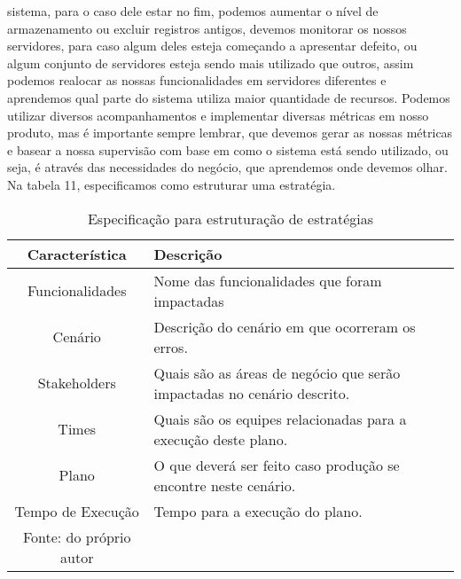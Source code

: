       sistema, para o caso dele estar no fim, podemos aumentar o nível de armazenamento
      ou excluir registros antigos, devemos monitorar os nossos servidores, para
      caso algum deles esteja começando a apresentar defeito, ou algum conjunto
      de servidores esteja sendo mais utilizado que outros, assim podemos realocar
      as nossas funcionalidades em servidores diferentes e aprendemos qual parte
      do sistema utiliza maior quantidade de recursos. Podemos utilizar diversos
      acompanhamentos e implementar diversas métricas em nosso produto, mas é
      importante sempre lembrar, que devemos gerar as nossas métricas e basear a
      nossa supervisão com base em como o sistema está sendo utilizado, ou seja,
      é através das necessidades do negócio, que aprendemos onde devemos olhar.
      Na tabela 11, especificamos como estruturar uma estratégia.\newline

      \begin{table}[h!]
        \centering
        \label{Tabela:11}
        \caption{Especificação para estruturação de estratégias}
        \begin{tabular}{c p{9cm}}
          \hline
          \textbf{Característica} &
          \textbf{Descrição} \\
          \hline
          Funcionalidades &
          Nome das funcionalidades que foram impactadas \\
          Cenário &
          Descrição do cenário em que ocorreram os erros. \\
          Stakeholders &
          Quais são as áreas de negócio que serão impactadas no cenário descrito. \\
          Times &
          Quais são os equipes relacionadas para a execução deste plano. \\
          Plano &
          O que deverá ser feito caso produção se encontre neste cenário. \\
          Tempo de Execução &
          Tempo para a execução do plano. \\ \hline
          \newline
          \small{Fonte: do próprio autor}
        \end{tabular}
      \end{table}

